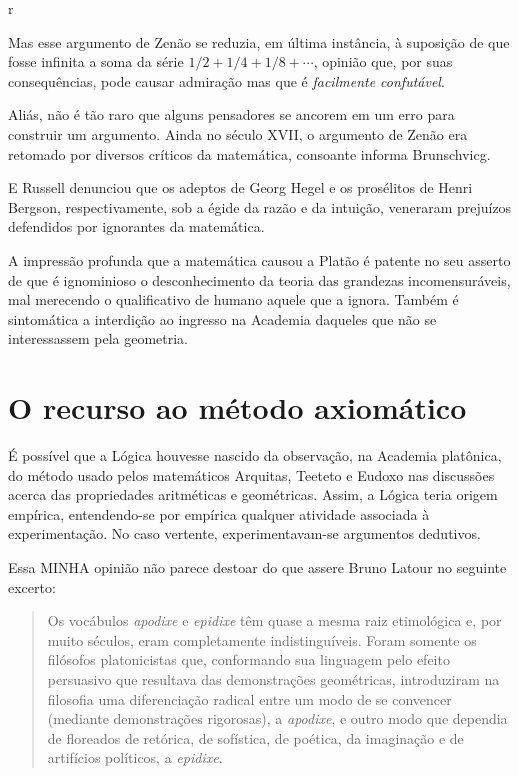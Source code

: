 r\documentclass{hipatia}
\begin{document}
Mas esse argumento de Zenão se reduzia, em última instância, à suposição de que fosse infinita a soma da série $1/2 + 1/4 + 1/8 + \cdots$, opinião que, por suas consequências, pode causar admiração mas que é \emph{facilmente confutável}. 

Aliás, não é tão raro que alguns pensadores se ancorem em um erro para construir um argumento. Ainda no século XVII, o argumento de Zenão era retomado por diversos críticos da matemática, consoante informa Brunschvicg.  \cite[p. 154]{brunschvicg1972}  

E Russell  denunciou que os adeptos de Georg Hegel e os prosélitos de Henri Bergson, respectivamente, sob a égide da razão e da intuição, veneraram prejuízos defendidos por ignorantes da matemática. \cite{russell1945}

A impressão profunda que a matemática causou a Platão é patente no seu asserto de que é ignominioso o desconhecimento da teoria das grandezas incomensuráveis, mal merecendo o qualificativo de humano aquele que a ignora. Também é sintomática a interdição ao ingresso na Academia daqueles que não se interessassem pela geometria. \cite[p. 21]{lanczos1970}\cite[p. 209--210]{russell1945}  


\section{O recurso ao método axiomático}

É possível que a Lógica houvesse nascido da observação, na Academia platônica, do método usado pelos matemáticos Arquitas, Teeteto e Eudoxo nas discussões acerca das propriedades aritméticas e geométricas. Assim, a Lógica teria origem empírica, entendendo-se por empírica qualquer atividade associada à experimentação. No caso vertente, experimentavam-se argumentos dedutivos.

Essa MINHA opinião não parece destoar do que assere Bruno Latour no seguinte excerto:
\begin{quote}
    Os vocábulos \emph{apodixe} e \emph{epidixe} têm quase a mesma raiz etimológica e, por muito séculos, eram completamente indistinguíveis. Foram somente os filósofos platonicistas que, conformando sua linguagem pelo efeito persuasivo que resultava das demonstrações geométricas, introduziram na filosofia uma diferenciação radical entre um modo de se convencer (mediante demonstrações rigorosas), a \emph{apodixe}, e outro modo que dependia de floreados de retórica, de sofística, de poética, da imaginação e de artifícios políticos, a \emph{epidixe}. \cite[p. 445--446]{latour2008}
\end{quote}
\end{document}

